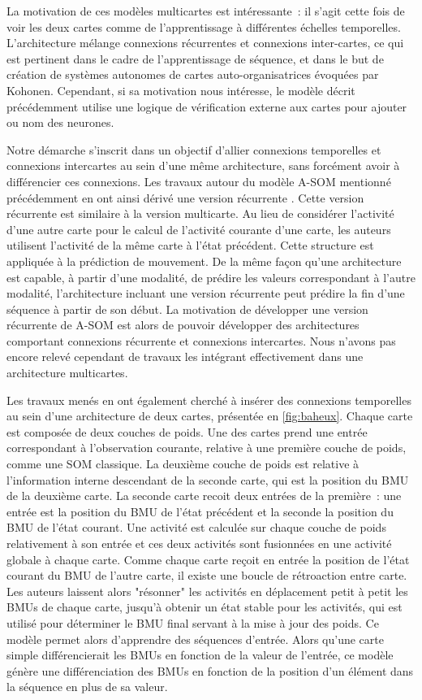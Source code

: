 \documentclass[../main]{subfiles}
\begin{document}
La motivation de ces modèles multicartes est intéressante~: il s'agit cette fois de voir les deux cartes comme de l'apprentissage à différentes échelles temporelles. L'architecture mélange connexions récurrentes et connexions inter-cartes, ce qui est pertinent dans le cadre de l'apprentissage de séquence, et dans le but de création de systèmes autonomes de cartes auto-organisatrices évoquées par Kohonen. 
Cependant, si sa motivation nous intéresse, le modèle décrit précédemment utilise une logique de vérification externe aux cartes pour ajouter ou nom des neurones. 

Notre démarche s'inscrit dans un objectif d'allier connexions temporelles et connexions intercartes au sein d'une même architecture, sans forcément avoir à différencier ces connexions.
Les travaux autour du modèle A-SOM mentionné précédemment en ont ainsi dérivé une version récurrente \cite{Buonamente2015DiscriminatingAS}. Cette version récurrente est similaire à la version multicarte. Au lieu de considérer l'activité d'une autre carte pour le calcul de l'activité courante d'une carte, les auteurs utilisent l'activité de la même carte à l'état précédent.
Cette structure est appliquée à la prédiction de mouvement. De la même façon qu'une architecture est capable, à partir d'une modalité, de prédire les valeurs correspondant à l'autre modalité, l'architecture incluant une version récurrente peut prédire la fin d'une séquence à partir de son début. La motivation de développer une version récurrente de A-SOM est alors de pouvoir développer des architectures comportant connexions récurrente et connexions intercartes. Nous n'avons pas encore relevé cependant de travaux les intégrant effectivement dans une architecture multicartes.

Les travaux menés en \cite{baheux_towards_2014} ont également cherché à insérer des connexions temporelles au sein d'une architecture de deux cartes, présentée en \ref{fig:baheux}. Chaque carte est composée de deux couches de poids. Une des cartes prend une entrée correspondant à l'observation courante, relative à une première couche de poids, comme une SOM classique. La deuxième couche de poids est relative à l'information interne descendant de la seconde carte, qui est la position du BMU de la deuxième carte. 
La seconde carte recoit deux entrées de la première~: une entrée est la position du BMU de l'état précédent et la seconde la position du BMU de l'état courant. Une activité est calculée sur chaque couche de poids relativement à son entrée et ces deux activités sont fusionnées en une activité globale à chaque carte.
Comme chaque carte reçoit en entrée la position de l'état courant du BMU de l'autre carte, il existe une boucle de rétroaction entre carte. Les auteurs laissent alors "résonner" les activités en déplacement petit à petit les BMUs de chaque carte, jusqu'à obtenir un état stable pour les activités, qui est utilisé pour déterminer le BMU final servant à la mise à jour des poids. 
Ce modèle permet alors d'apprendre des séquences d'entrée. Alors qu'une carte simple différencierait les BMUs en fonction de la valeur de l'entrée, ce modèle génère une différenciation des BMUs en fonction de la position d'un élément dans la séquence en plus de sa valeur. 
\end{document}
